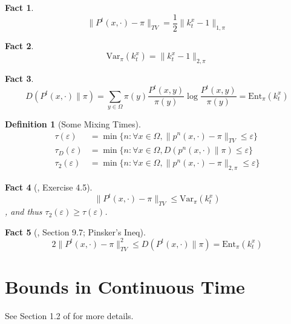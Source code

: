 \documentclass{article}
\newtheorem{fact}{Fact}[section]
\newtheorem{define}{Definition}[section]
\begin{document}
\begin{fact}
  \[\parallel P^t(x, \cdot) - \pi \parallel_{TV} = \frac{1}{2}\parallel k^x_t - 1 \parallel_{1,\pi}\]
\end{fact}

\begin{fact}
  \[\mathrm{Var}_\pi(k^x_t) = \parallel k^x_t - 1 \parallel_{2, \pi}\]
\end{fact}

\begin{fact}
  \[D(P^t(x, \cdot) \parallel \pi) =\sum_{y\in \Omega}\pi(y)\frac{P^t(x, y)}{\pi(y)}\log \frac{P^t(x,y)}{\pi(y)} = \mathrm{Ent}_\pi (k^x_t)\]
\end{fact}

\begin{define}[Some Mixing Times]
  \begin{align*}
    \tau(\varepsilon) &= \min\{n: \forall x\in \Omega, \parallel p^n(x,\cdot) - \pi \parallel_{TV} \leq \varepsilon\} \\
    \tau_D(\varepsilon) &= \min\{n: \forall x\in \Omega, D(p^n(x,\cdot) \parallel \pi) \leq \varepsilon\} \\
    \tau_2(\varepsilon) &= \min\{n: \forall x\in \Omega, \parallel p^n(x,\cdot) - \pi \parallel_{2, \pi} \leq \varepsilon\} 
  \end{align*}
\end{define}

\begin{fact}[\cite{levin2017markov}, Exercise 4.5]
  \[\parallel P^t(x, \cdot) - \pi \parallel_{TV} \leq \mathrm{Var}_\pi(k^x_t)\],
  and thus $\tau_2(\varepsilon) \geq \tau(\varepsilon)$.
\end{fact}

\begin{fact}[\cite{jerrum2005integrating}, Section 9.7; Pinsker's Ineq]
  \[2\parallel P^t(x,\cdot) - \pi \parallel^2_{TV} \leq D(P^t(x, \cdot) \parallel \pi) = \mathrm{Ent}_\pi(k^x_t)\]
\end{fact}

\section{Bounds in Continuous Time}
See Section 1.2 of \cite{montenegro2006mathematical} for more details.

\clearpage


\end{document}
